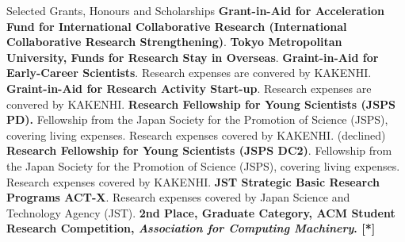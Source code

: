 \begin{rubric}{Selected Grants, Honours and Scholarships}
  \entry*[2026] \textbf{Grant-in-Aid for Acceleration Fund for International Collaborative Research (International Collaborative Research Strengthening)}.
  \entry*[2025] \textbf{Tokyo Metropolitan University, Funds for Research Stay
    in Overseas}.
  \entry*[2025] \textbf{Graint-in-Aid for Early-Career Scientists}. Research expenses are convered by KAKENHI.
  \entry*[2024] \textbf{Graint-in-Aid for Research Activity Start-up}. Research expenses are convered by KAKENHI.
  \entry*[2023] \textbf{Research Fellowship for Young Scientists (JSPS PD).}
  Fellowship from the Japan Society for the Promotion of Science (JSPS), covering
  living expenses. Research expenses covered by KAKENHI. (declined)
  \entry*[2021] \textbf{Research Fellowship for Young Scientists (JSPS DC2)}.
  Fellowship from the Japan Society for the Promotion of Science (JSPS), covering
  living expenses. Research expenses covered by KAKENHI.
  \entry*[2020] \textbf{JST Strategic Basic Research Programs ACT-X}. Research
  expenses covered by Japan Science and Technology Agency (JST).
  \entry*[2019] \textbf{2nd Place, Graduate Category, ACM Student Research
    Competition, \textit{Association for Computing Machinery}. [*]}
\end{rubric}
